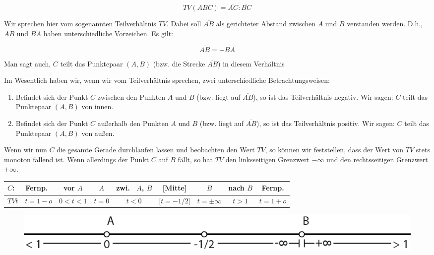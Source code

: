 \documentclass[12pt,a4paper]{article}
\begin{document}
\[TV(A B C) = \overline{A C} : \overline{B C}\]

Wir sprechen hier vom sogenannten Teilverhältnis $TV$. Dabei soll $\overline{A B}$ als gerichteter Abstand zwischen $A$ und $B$ verstanden werden. D.h., $\overline{A B}$ und $\overline{B A}$ haben unterschiedliche Vorzeichen. Es gilt: 

\[\overline{A B} = -\overline{B A}\]

Man sagt auch, $C$ teilt das Punktepaar $(A , B)$ (bzw. die Strecke $\overline{A B}$) in diesem Verhältnis \citep[S.~76]{projektiveGeometrie}

Im Wesentlich haben wir, wenn wir vom Teilverhältnis sprechen, zwei unterschiedliche Betrachtungsweisen:
\begin{enumerate}
\item Befindet sich der Punkt $C$ zwischen den Punkten $A$ und $B$ (bzw. liegt auf $\overline{A B}$), so ist das Teilverhältnis negativ. Wir sagen: $C$ teilt das Punktepaar $(A , B)$ \glqq von innen\grqq .
\item Befindet sich der Punkt $C$ außerhalb den Punkten $A$ und $B$ (bzw. liegt auf $\overline{A B}$), so ist das Teilverhältnis positiv. Wir sagen: $C$ teilt das Punktepaar $(A , B)$ \glqq von außen\grqq .
\end{enumerate}

Wenn wir nun $C$ die gesamte Gerade durchlaufen lassen und beobachten den Wert $TV$, so können wir feststellen, dass der Wert von $TV$ stets monoton fallend ist. Wenn allerdings der Punkt $C$ auf $B$ fällt, so hat $TV$ den linksseitigen Grenzwert $-\infty$ und den rechtsseitigen Grenzwert $+\infty$.
\newpage
\begin{center}
\begin{scriptsize}
\begin{tabular}[htbp]{l|c|c|c|c|c|c|c|c}
$C$: & Fernp.~ & vor $A$ &  $A$ & zwi.~ $A$, $B$ & [Mitte] & $B$ & nach $B$ & Fernp.\\
\hline
$TV t$ & $t = 1 - o$ & $0 < t < 1$ & $t = 0$ & $t < 0$ & [$t = -1/2$] & $t = \pm\infty$ & $t > 1$ & $t = 1 + o$\\
\end{tabular}
\end{scriptsize}
\end{center}

\begin{figure}[htbp]
\centering
\includegraphics[width=\textwidth]{Bilder/tv_strahl.png}
\end{figure}
\end{document}
